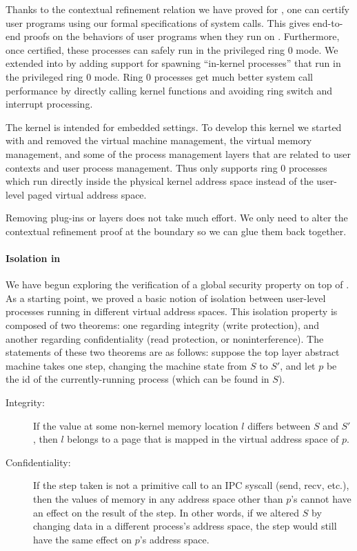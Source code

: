 {Thanks to the contextual refinement relation we have proved for
\mCTOSbase{}, one can certify user programs using our formal
specifications of system calls. This gives end-to-end proofs on
the behaviors of user programs when they run on \mCTOSbase{}.  
Furthermore, once certified, these processes can safely run in
the privileged ring 0 mode.  We extended \mCTOSbase{} into
\mCTOSringz{} by adding support for spawning ``in-kernel
processes'' that run in the privileged ring 0 mode. 
Ring 0 processes get much
better system call performance by directly calling kernel
functions and avoiding ring switch and interrupt processing. 

The \mCTOSembed{} kernel is intended for embedded settings. To develop
this kernel we started with \mCTOSringz{} and removed the virtual
machine management, the virtual memory management, and some of the
process management layers that are related to user contexts and user
process management.  Thus \mCTOSembed{} only supports ring 0 processes
which run directly inside the physical kernel address space instead of
the user-level paged virtual address space.

Removing plug-ins or layers does not take much effort.
We only need to alter the contextual refinement proof 
at the boundary so we can glue them back together.

\paragraph{Isolation in \mCTOSbase{}}
\label{security}
We have begun exploring the verification of a global security property
on top of \mCTOSbase{}. As a starting point, we proved a basic notion
of isolation between user-level processes running in different virtual
address spaces. This isolation property is composed of two theorems:
one regarding integrity (write protection), and another regarding
confidentiality (read protection, or noninterference).  The statements
of these two theorems are as follows: suppose the top layer abstract
machine takes one step, changing the machine state from $S$ to $S'$,
and let $p$ be the id of the currently-running process (which can be
found in $S$).
\begin{description}
  \item[Integrity:]
If the value at some non-kernel memory location $l$ differs between
$S$ and $S'$, then $l$ belongs to a page that is mapped in the 
virtual address space of $p$.
\item[Confidentiality:]
\label{confidential}
If the step taken
is not a primitive call to an IPC syscall (send, recv, etc.), then the values
of memory in any address space other than $p$'s cannot have an effect on the
result of the step. In other words, if we altered $S$ 
by changing data in a different process's address space, the step would still 
have the same effect on $p$'s address space.
\end{description}

}
